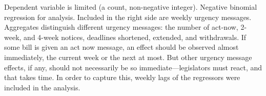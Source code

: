 \documentclass[letter,12pt]{article}
\begin{document}
Dependent variable is limited (a count, non-negative integer). Negative binomial regression for analysis. Included in the right side are weekly urgency messages. Aggregates distinguish different urgency messages: the number of act-now, 2-week, and 4-week notices, deadlines shortened, extended, and withdrawals. If some bill is given an act now message, an effect should be observed almost immediately, the current week or the next at most. But other urgency message effects, if any, should not necessarily be so immediate---legislators must react, and that takes time. In order to capture this, weekly lags of the regressors were included in the analysis. 


% 
% 
% 
% 
% 
\end{document}
